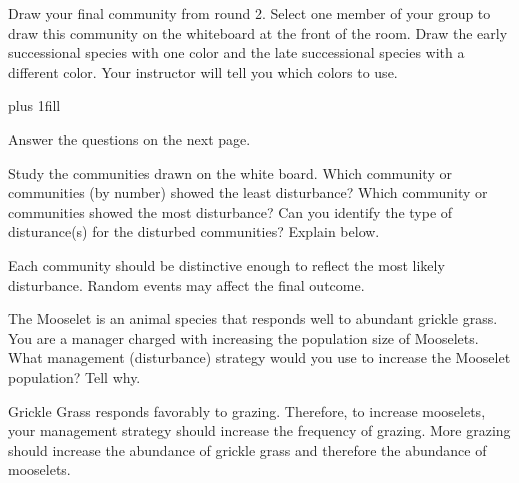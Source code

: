 \documentclass[12pt, hidelinks]{exam}
\newcommand*\AnswerBox[2]{%
    \parbox[t][#1]{0.92\textwidth}{%
    \begin{solution}#2\end{solution}}
    \vspace{\stretch{1}}
}
\newlength{\basespace}
\newcommand*\AnswerBlank[1]{%
	\ifprintanswers%
		\textbf{#1}
	\else%
		\rule{0.75in}{0.4pt}\kern0.67pt.\fi%
	}
\begin{document}
\begin{questions}
\question
Draw your final community from round 2.  Select one member of your group to draw this community on the whiteboard at the front of the room. Draw the early successional species with one color and the late successional species with a different color. Your instructor will tell you which colors to use.

\vskip0pt plus 1fill

Answer the questions on the next page.

\newpage

\question
Study the communities drawn on the white board. Which community or communities (by number) showed the least disturbance? Which community or communities showed the most disturbance? Can you identify the type of disturance(s) for the disturbed communities? Explain below.\medskip

%	
%	
%	
%	

\AnswerBox{1\basespace}{Each community should be distinctive enough to reflect the most likely disturbance. Random events may affect the final outcome.}

\question[Checkout]
The Mooselet is an animal species that responds well to abundant grickle grass. You are a manager charged with increasing the population size of Mooselets. What management (disturbance) strategy would you use to increase the Mooselet population? Tell why.

\AnswerBox{2\basespace}{Grickle Grass responds favorably to grazing. Therefore, to increase
	mooselets, your management strategy should increase the frequency of grazing. More grazing
	should increase the abundance of grickle grass and therefore the abundance of mooselets.}



\end{questions}
	
\end{document}
